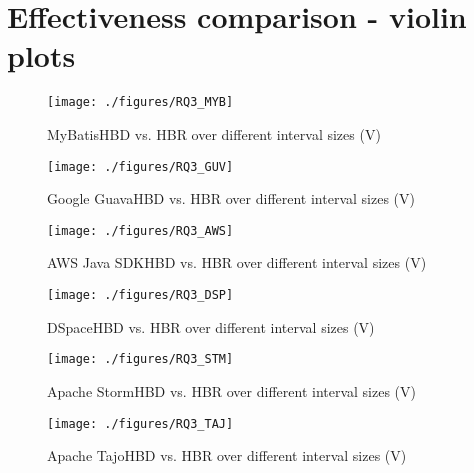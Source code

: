 \documentclass[1p]{elsarticle}
\begin{document}
\appendix 

\section{Effectiveness comparison - violin plots}
\label{appendix_plots}

\begin{figure}[H]
\centering
\texttt{[image: ./figures/RQ3\_MYB]}
\caption{MyBatis\textendash HBD vs. HBR over different interval sizes (V)} \label{fig:RQ3_1}
\end{figure}

\begin{figure}[H]
\centering
\texttt{[image: ./figures/RQ3\_GUV]}
\caption{Google Guava\textendash HBD vs. HBR over different interval sizes (V)} \label{fig:RQ3_2}
\end{figure}

\begin{figure}[H]
\centering
\texttt{[image: ./figures/RQ3\_AWS]}
\caption{AWS Java SDK\textendash HBD vs. HBR over different interval sizes (V)} \label{fig:RQ3_3}
\end{figure}

\begin{figure}[H]
\centering
\texttt{[image: ./figures/RQ3\_DSP]}
\caption{DSpace\textendash HBD vs. HBR over different interval sizes (V)} 
\label{fig:RQ3_4}
\end{figure}

\begin{figure}[H]
\centering
\texttt{[image: ./figures/RQ3\_STM]}
\caption{Apache Storm\textendash HBD vs. HBR over different interval sizes (V)} \label{fig:RQ3_5}
\end{figure}

\begin{figure}[H]
\centering
\texttt{[image: ./figures/RQ3\_TAJ]}
\caption{Apache Tajo\textendash HBD vs. HBR over different interval sizes (V)} \label{fig:RQ3_6}
\end{figure}
\end{document}
